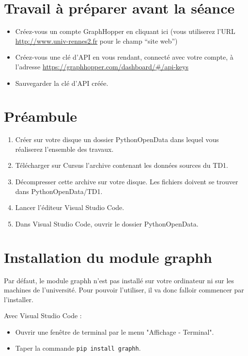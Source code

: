 \documentclass[11pt,a4paper]{article}
\begin{document}
\section*{Travail à préparer avant la séance}
\begin{itemize}
    \item Créez-vous un compte GraphHopper en cliquant ici (vous utiliserez l’URL \url{http://www.univ-rennes2.fr} pour le champ “site web”)
\item Créez-vous une clé d’API en vous rendant, connecté avec votre compte, à l’adresse \url{https://graphhopper.com/dashboard/#/api-keys}
\item Sauvegarder la clé d'API créée.
\end{itemize}

\section*{Préambule}
\begin{enumerate}
    \item Créer sur votre disque un dossier PythonOpenData dans lequel vous réaliserez l'ensemble des travaux. 
    \item Télécharger sur Cursus l'archive contenant les données sources du TD1.
    \item Décompresser cette archive sur votre disque. 
    Les fichiers doivent se trouver dans PythonOpenData/TD1.
    \item Lancer l'éditeur Visual Studio Code.
    \item Dans Visual Studio Code, ouvrir le dossier PythonOpenData. 
\end{enumerate}

\section*{Installation du module graphh}

Par défaut, le module graphh n’est pas installé sur votre ordinateur ni sur les machines de l’université. Pour pouvoir l’utiliser, il va donc falloir commencer par l’installer. 

Avec Visual Studio Code : 
\begin{itemize}
    \item Ouvrir une fenêtre de terminal par le menu "Affichage - Terminal".
    \item Taper la commande \verb+pip install graphh+.
\end{itemize}
\end{document}
